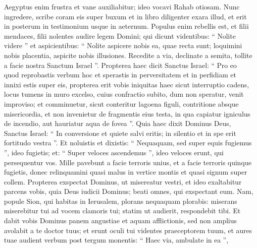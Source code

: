 \begin{biblechapter}
\begin{biblechapter}
\begin{biblechapter}
\begin{biblechapter}
\begin{biblechapter}
\begin{biblechapter}
\begin{biblechapter}
\begin{biblechapter}
\begin{biblechapter}
\begin{biblechapter}
\begin{biblechapter}
\begin{biblechapter}
\begin{biblechapter}
\begin{biblechapter}
\begin{biblechapter}
\begin{biblechapter}
\begin{biblechapter}
\begin{biblechapter}
\begin{biblechapter}
\begin{biblechapter}
\begin{biblechapter}
\begin{biblechapter}
\begin{biblechapter}
\begin{biblechapter}
\begin{biblechapter}
\begin{biblechapter}
\begin{biblechapter}
\begin{biblechapter}
\begin{biblechapter}
\begin{biblechapter}
 \verse Aegyptus enim frustra et vane auxiliabitur;
 ideo vocavi Rahab otiosam.
 \verse Nunc ingredere, scribe coram eis super buxum
 et in libro diligenter exara illud,
 et erit in posterum
 in testimonium usque in aeternum.
 \verse Populus enim rebellis est,
 et filii mendaces,
 filii nolentes audire legem Domini;
 \verse qui dicunt videntibus: “ Nolite videre ”
 et aspicientibus: “ Nolite aspicere nobis ea, quae recta sunt;
 loquimini nobis placentia, aspicite nobis illusiones.
 \verse Recedite a via, declinate a semita,
 tollite a facie nostra Sanctum Israel ”.
 \verse Propterea haec dicit Sanctus Israel:
 “ Pro eo quod reprobastis verbum hoc
 et sperastis in perversitatem et in perfidiam
 et innixi estis super eis,
 \verse propterea erit vobis iniquitas haec
 sicut interruptio cadens, locus tumens in muro excelso,
 cuius confractio subito, dum non speratur,
 venit improviso;
 \verse et comminuetur, sicut conteritur lagoena figuli,
 contritione absque misericordia,
 et non invenietur de fragmentis eius testa,
 in qua capiatur igniculus de incendio,
 aut hauriatur aqua de fovea ”.
 \verse Quia haec dixit Dominus Deus, Sanctus Israel:
 “ In conversione et quiete salvi eritis;
 in silentio et in spe erit fortitudo vestra ”.
 Et noluistis \verse et dixistis:
 “ Nequaquam, sed super equis fugiemus ”,
 ideo fugietis;
 et: “ Super veloces ascendemus ”,
 ideo veloces erunt, qui persequentur vos.
 \verse Mille pavebunt a facie terroris unius,
 et a facie terroris quinque fugietis,
 donec relinquamini
 quasi malus in vertice montis
 et quasi signum super collem.
 \verse Propterea exspectat Dominus, ut misereatur vestri,
 et ideo exaltabitur parcens vobis,
 quia Deus iudicii Dominus;
 beati omnes, qui exspectant eum.
 \verse Nam, popule Sion, qui habitas in Ierusalem,
 plorans nequaquam plorabis:
 miserans miserebitur tui ad vocem clamoris tui;
 statim ut audierit, respondebit tibi. 
\verse Et dabit vobis Dominus
 panem angustiae et aquam afflictionis,
 sed non amplius avolabit a te doctor tuus;
 et erunt oculi tui videntes praeceptorem tuum,
 \verse et aures tuae audient verbum post tergum monentis:
 “ Haec via, ambulate in ea ”,

\end{biblechapter}
\end{biblechapter}
\end{biblechapter}
\end{biblechapter}
\end{biblechapter}
\end{biblechapter}
\end{biblechapter}
\end{biblechapter}
\end{biblechapter}
\end{biblechapter}
\end{biblechapter}
\end{biblechapter}
\end{biblechapter}
\end{biblechapter}
\end{biblechapter}
\end{biblechapter}
\end{biblechapter}
\end{biblechapter}
\end{biblechapter}
\end{biblechapter}
\end{biblechapter}
\end{biblechapter}
\end{biblechapter}
\end{biblechapter}
\end{biblechapter}
\end{biblechapter}
\end{biblechapter}
\end{biblechapter}
\end{biblechapter}
\end{biblechapter}
